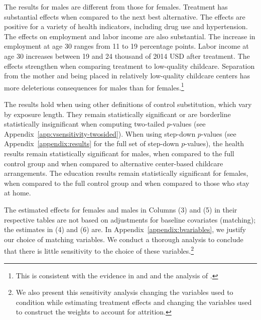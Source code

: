 The results for males are different from those for females. Treatment has substantial effects when compared to the next best alternative. The effects are positive for a variety of health indicators, including drug use and hypertension. The effects on employment and labor income are also substantial. The increase in employment at age 30 ranges from 11 to 19 percentage points. Labor income at age 30 increases between 19 and 24 thousand of 2014 USD after treatment. The effects strengthen when comparing treatment to low-quality childcare. Separation from the mother and being placed in relatively low-quality childcare centers has more deleterious consequences for males than for females.\footnote{This is consistent with the evidence in \citet{Baker_Gruber_Milligan_2015_Noncog_Defects} and \citet{Kottelenberg-Lehrer_2014_Gender-Effects} and the analysis of \citet{golding2016psychology}.}

The results hold when using other definitions of control substitution, which vary by exposure length. They remain statistically significant or are borderline statistically insignificant when computing two-tailed $p$-values (see Appendix~\ref{app:vsensitivity-twosided}). When using step-down $p$-values (see Appendix~\ref{appendix:results} for the full set of step-down $p$-values), the health results remain statistically significant for males, when compared to the full control group and when compared to alternative center-based childcare arrangements. The education results remain statistically significant for females, when compared to the full control group and when compared to those who stay at home.

The estimated effects for females and males in Columns (3) and (5) in their respective tables are not based on adjustments for baseline covariates (matching); the estimates in (4) and (6) are. In Appendix~\ref{appendix:bvariables}, we justify our choice of matching variables. We conduct a thorough analysis to conclude that there is little sensitivity to the choice of these variables.\footnote{We also present this sensitivity analysis changing the variables used to condition while estimating treatment effects and changing the variables used to construct the weights to account for attrition.}

